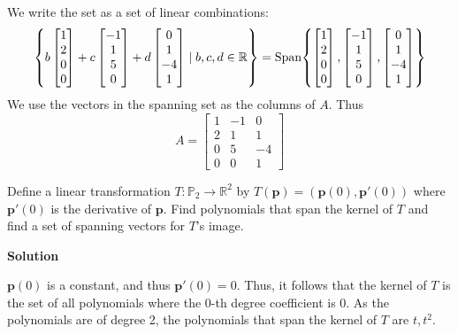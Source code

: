 \documentclass[11pt]{scrartcl}
\theoremstyle{dotlessP}
\theoremstyle{dotlessN}
\DeclarePairedDelimiter\set{\{}{\}}
\newcommand{\reals}{\mathbb{R}} %
\newcommand{\spa}[1]{\text{Span}\set*{#1}}
\newcommand{\mb}[1]{\mathbf{#1}}
\begin{document}
We write the set as a set of linear combinations:
\[
	\set*{
b 
\begin{bmatrix}
	1 \\
	2 \\
	0 \\
	0
\end{bmatrix} + 
c 
\begin{bmatrix}
	-1 \\
	1 \\
	5 \\
	0
\end{bmatrix} + 
d
\begin{bmatrix}
	0 \\
	1 \\
	-4 \\
	1
\end{bmatrix}
\mid 
b,c,d \in \reals
} = \spa{
\begin{bmatrix}
	1 \\
	2 \\
	0 \\
	0
\end{bmatrix}, 
\begin{bmatrix}
	-1 \\
	1 \\
	5 \\
	0
\end{bmatrix},
\begin{bmatrix}
	0 \\
	1 \\
	-4 \\
	1
\end{bmatrix}
}
\] 
We use the vectors in the spanning set as the columns of $A$. Thus
 \[
A = 
\begin{bmatrix}
	1 & -1 & 0 \\
	2 & 1 & 1 \\
	0 & 5 & -4 \\
	0 & 0 & 1
\end{bmatrix}
\] 
\begin{ques}
	Define a linear transformation $T: \mathbb{P}_2 \to \reals^2$ by $T(\mb{p}) = (\mb{p}(0), \mb{p}'(0))$ where $\mb{p}'(0)$ is the derivative of  $\mb{p}$. Find polynomials that span the kernel of $T$ and find a set of spanning vectors for  $T$'s image.
\end{ques}
\textbf{Solution}

$\mb{p}(0)$ is a constant, and thus $\mb{p}'(0) = 0$. Thus, it follows that the kernel of $T$ is the set of all polynomials where the 0-th degree coefficient is 0.  As the polynomials are of degree 2, the polynomials that span the kernel of $T$ are $t, t^2$.
\\
\end{document}

